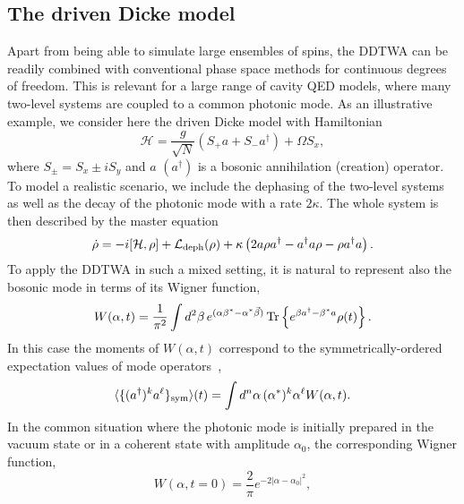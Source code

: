 \documentclass[pra,twocolumn,showpacs,preprintnumbers,amsmath,amssymb,superscriptaddress]{revtex4-1}
\newcommand{\abs}[1]{\lvert#1\rvert}
\newcommand{\sz}{\sigma^{z}}
\begin{document}
\subsection{The driven Dicke model}\label{sec:Dicke}
Apart from being able to simulate large ensembles of spins, the DDTWA can be readily combined with conventional phase space methods for continuous degrees of freedom. This is relevant for a large range of cavity QED models, where many two-level systems are coupled to a common photonic mode. As an illustrative example, we consider here the driven Dicke model with Hamiltonian
\begin{equation}
\mathcal{H}=\frac{g}{\sqrt{N}}\left ( S_+ a + S_- a^\dagger \right) + \Omega S_x,
\label{eq:DickeH}
\end{equation}
where $S_\pm=S_x\pm i S_y$ and $a$ $(a^\dag)$ is a bosonic annihilation (creation) operator.  To model a realistic scenario, we include the dephasing of the two-level systems as well as the decay of  the photonic mode with a rate $2\kappa$. The whole system is then described by the master equation
\begin{equation}
\begin{split}
\dot{\rho}=-i [\mathcal{H},\rho]+ \mathcal{L}_{\rm deph}(\rho) + \kappa \left(2a\rho a^\dag - a^\dag a \rho - \rho a^\dag a\right).
\label{eq:DickeL}
\end{split}
\end{equation}
To apply the DDTWA in such a mixed setting, it is natural to represent also the bosonic mode in terms of its Wigner function,
\begin{equation}
W(\alpha, t)=\frac{1}{\pi^{2}}\int  d^{2} \beta \, e^{(\alpha \beta^*-\alpha^*\vec \beta )} \, {\rm Tr} \left\{ e^{\beta a^\dag-\beta^*a } \rho(t) \right\}.
\end{equation}	
In this case the moments of $W(\alpha, t)$ correspond to the symmetrically-ordered expectation values of mode operators~\cite{WallsMilburn,GardinerZoller}, 
\begin{equation}
\langle \{(a^\dag)^k a^\ell \}_{\rm sym}  \rangle (t) = \int d^n \alpha \,  (\alpha^{*})^k  \alpha^\ell W(\alpha,t).
\end{equation}
In the common situation where the photonic mode is initially prepared in the vacuum state or in a coherent state with amplitude $\alpha_0$, the corresponding Wigner function, 
\begin{equation}
W(\alpha, t=0) =\frac{2}{\pi} e^{-2\abs{\alpha-\alpha_0}^2}, 
\end{equation}
\end{document}
